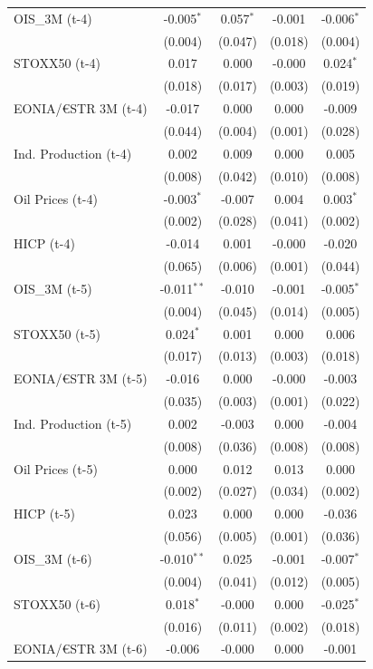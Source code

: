 \begin{longtable}[t]{lcccc}
OIS\_3M (t-4) & -0.005$^{*}$ & 0.057$^{*}$ & -0.001 & -0.006$^{*}$\\
 & (0.004) & (0.047) & (0.018) & (0.004)\\
STOXX50 (t-4) & 0.017 & 0.000 & -0.000 & 0.024$^{*}$\\
 & (0.018) & (0.017) & (0.003) & (0.019)\\
EONIA/€STR 3M (t-4) & -0.017 & 0.000 & 0.000 & -0.009\\
 & (0.044) & (0.004) & (0.001) & (0.028)\\
Ind. Production (t-4) & 0.002 & 0.009 & 0.000 & 0.005\\
 & (0.008) & (0.042) & (0.010) & (0.008)\\
Oil Prices (t-4) & -0.003$^{*}$ & -0.007 & 0.004 & 0.003$^{*}$\\
 & (0.002) & (0.028) & (0.041) & (0.002)\\
HICP (t-4) & -0.014 & 0.001 & -0.000 & -0.020\\
 & (0.065) & (0.006) & (0.001) & (0.044)\\
OIS\_3M (t-5) & -0.011$^{**}$ & -0.010 & -0.001 & -0.005$^{*}$\\
 & (0.004) & (0.045) & (0.014) & (0.005)\\
STOXX50 (t-5) & 0.024$^{*}$ & 0.001 & 0.000 & 0.006\\
 & (0.017) & (0.013) & (0.003) & (0.018)\\
EONIA/€STR 3M (t-5) & -0.016 & 0.000 & -0.000 & -0.003\\
 & (0.035) & (0.003) & (0.001) & (0.022)\\
Ind. Production (t-5) & 0.002 & -0.003 & 0.000 & -0.004\\
 & (0.008) & (0.036) & (0.008) & (0.008)\\
Oil Prices (t-5) & 0.000 & 0.012 & 0.013 & 0.000\\
 & (0.002) & (0.027) & (0.034) & (0.002)\\
HICP (t-5) & 0.023 & 0.000 & 0.000 & -0.036\\
 & (0.056) & (0.005) & (0.001) & (0.036)\\
OIS\_3M (t-6) & -0.010$^{**}$ & 0.025 & -0.001 & -0.007$^{*}$\\
 & (0.004) & (0.041) & (0.012) & (0.005)\\
STOXX50 (t-6) & 0.018$^{*}$ & -0.000 & 0.000 & -0.025$^{*}$\\
 & (0.016) & (0.011) & (0.002) & (0.018)\\
EONIA/€STR 3M (t-6) & -0.006 & -0.000 & 0.000 & -0.001\\

\end{longtable}
